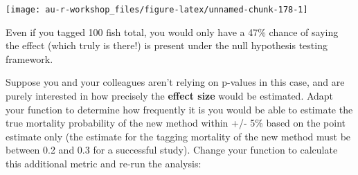 \documentclass[]{book}
\theoremstyle{definition}
\theoremstyle{definition}
\theoremstyle{definition}
\theoremstyle{remark}
\begin{document}
\begin{center}\texttt{[image: au-r-workshop\_files/figure-latex/unnamed-chunk-178-1]} \end{center}

Even if you tagged 100 fish total, you would only have a 47\% chance of
saying the effect (which truly is there!) is present under the null
hypothesis testing framework.

Suppose you and your colleagues aren't relying on p-values in this case,
and are purely interested in how precisely the \textbf{effect size}
would be estimated. Adapt your function to determine how frequently it
is you would be able to estimate the true mortality probability of the
new method within +/- 5\% based on the point estimate only (the estimate
for the tagging mortality of the new method must be between 0.2 and 0.3
for a successful study). Change your function to calculate this
additional metric and re-run the analysis:
\end{document}
